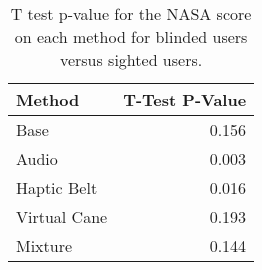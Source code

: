 
\begin{table}[!htb]
\centering
\caption{T test p-value for the NASA score on each method for blinded users versus sighted users.}
\label{tab:ttest_nasa_score}
\begin{tabular}{lr}
\toprule
      Method &  T-Test P-Value \\
\midrule
        Base &           0.156 \\
       Audio &           0.003 \\
 Haptic Belt &           0.016 \\
Virtual Cane &           0.193 \\
     Mixture &           0.144 \\
\bottomrule
\end{tabular}
\end{table}

